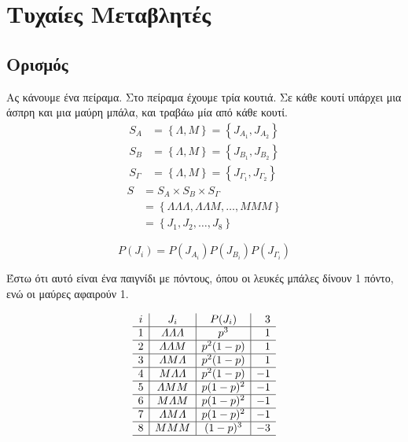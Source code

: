 \documentclass[11pt,a4paper,notitlepage,fleqn,final]{article}
\begin{document}
	\section{Τυχαίες Μεταβλητές}
	\subsection{Ορισμός}
	Ας κάνουμε ένα πείραμα. Στο πείραμα έχουμε τρία κουτιά. Σε κάθε
	κουτί υπάρχει μια άσπρη και μια μαύρη μπάλα, και τραβάω μία από
	κάθε κουτί.
	\begin{align*}
		S_A &= \left\lbrace \varLambda, M \right\rbrace
		= \left\lbrace J_{A_1},J_{A_2} \right\rbrace \\
		S_B &= \left\lbrace \varLambda, M \right\rbrace
		= \left\lbrace J_{B_1},J_{B_2} \right\rbrace \\
		S_\varGamma &= \left\lbrace \varLambda, M \right\rbrace
		= \left\lbrace J_{\varGamma_1},J_{\varGamma_2} \right\rbrace
	\end{align*}
	\begin{align*}
		S &= S_A \times S_B \times S_\varGamma \\
		&= \left\lbrace \varLambda\varLambda\varLambda,
		\varLambda\varLambda M,\dots,MMM \right\rbrace
		\\ &= \left\lbrace J_1,J_2,\dots,J_8 \right\rbrace
	\end{align*}
	
	\[
	P(J_i) = P(J_{A_i}) P(J_{B_i}) P(J_{\varGamma_i})
	\]
	
	Έστω ότι αυτό είναι ένα παιγνίδι με πόντους, όπου οι λευκές μπάλες
	δίνουν 1 πόντο, ενώ οι μαύρες αφαιρούν 1.
	
	\[
	\begin{array}{c|c|c|r}
		i &              J_i               &  P(J_i)  & 3 \\ \hline
		1 & \varLambda\varLambda\varLambda &   p^3    & 1 \\ \hline
		2 &     \varLambda\varLambda M     & p^2(1-p) & 1 \\ \hline
		3 &    \varLambda M \varLambda     & p^2(1-p) & 1 \\ \hline
		4 &     M\varLambda\varLambda      & p^2(1-p) & -1 \\ \hline
		5 &         \varLambda M M         & p(1-p)^2 & -1 \\ \hline
		6 &         M \varLambda M         & p(1-p)^2 & -1 \\ \hline
		7 &    \varLambda M \varLambda     & p(1-p)^2 & -1 \\ \hline
		8 &             M M M              & (1-p)^3  & -3 \\ \hline
	\end{array}
	\]
	
\end{document}
